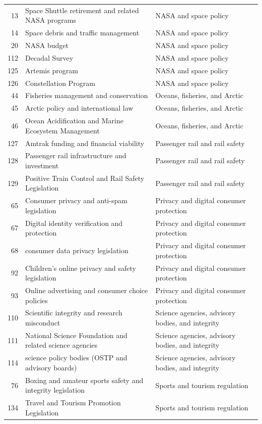 \begin{longtable}{rll}
13 & Space Shuttle retirement and related NASA programs & NASA and space policy \\
14 & Space debris and traffic management & NASA and space policy \\
20 & NASA budget & NASA and space policy \\
112 & Decadal Survey & NASA and space policy \\
125 & Artemis program & NASA and space policy \\
126 & Constellation Program & NASA and space policy \\
44 & Fisheries management and conservation & Oceans, fisheries, and Arctic \\
45 & Arctic policy and international law & Oceans, fisheries, and Arctic \\
46 & Ocean Acidification and Marine Ecosystem Management & Oceans, fisheries, and Arctic \\
127 & Amtrak funding and financial viability & Passenger rail and rail safety \\
128 & Passenger rail infrastructure and investment & Passenger rail and rail safety \\
129 & Positive Train Control and Rail Safety Legislation & Passenger rail and rail safety \\
65 & Consumer privacy and anti-spam legislation & Privacy and digital consumer protection \\
67 & Digital identity verification and protection & Privacy and digital consumer protection \\
68 & consumer data privacy legislation & Privacy and digital consumer protection \\
92 & Children's online privacy and safety legislation & Privacy and digital consumer protection \\
93 & Online advertising and consumer choice policies & Privacy and digital consumer protection \\
110 & Scientific integrity and research misconduct & Science agencies, advisory bodies, and integrity \\
111 & National Science Foundation and related science agencies & Science agencies, advisory bodies, and integrity \\
114 & science policy bodies (OSTP and advisory boards) & Science agencies, advisory bodies, and integrity \\
76 & Boxing and amateur sports safety and integrity legislation & Sports and tourism regulation \\
134 & Travel and Tourism Promotion Legislation & Sports and tourism regulation \\

\end{longtable}
